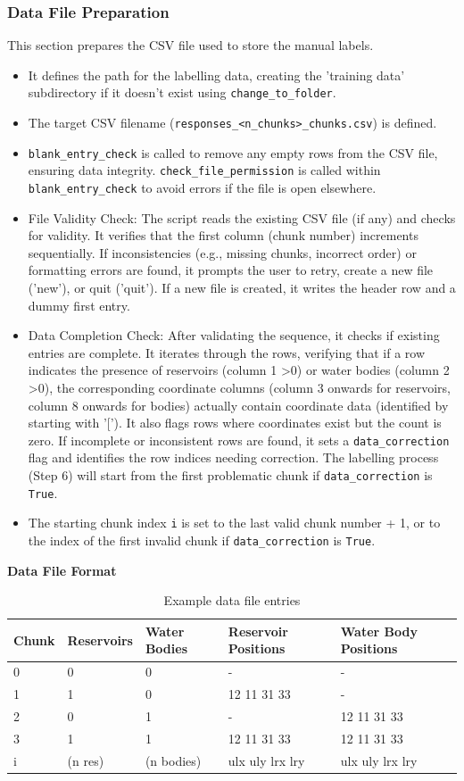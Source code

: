 \subsubsection{Data File Preparation}
This section prepares the CSV file used to store the manual labels.
\begin{itemize}
    \item It defines the path for the labelling data, creating the 'training data' subdirectory if it doesn't exist using \verb|change_to_folder|.
    \item The target CSV filename (\verb|responses_<n_chunks>_chunks.csv|) is defined.
    \item \verb|blank_entry_check| is called to remove any empty rows from the CSV file, ensuring data integrity. \verb|check_file_permission| is called within \verb|blank_entry_check| to avoid errors if the file is open elsewhere.
    \item File Validity Check: The script reads the existing CSV file (if any) and checks for validity. It verifies that the first column (chunk number) increments sequentially. If inconsistencies (e.g., missing chunks, incorrect order) or formatting errors are found, it prompts the user to retry, create a new file ('new'), or quit ('quit'). If a new file is created, it writes the header row and a dummy first entry.
    \item Data Completion Check: After validating the sequence, it checks if existing entries are complete. It iterates through the rows, verifying that if a row indicates the presence of reservoirs (column 1 \textgreater 0) or water bodies (column 2 \textgreater 0), the corresponding coordinate columns (column 3 onwards for reservoirs, column 8 onwards for bodies) actually contain coordinate data (identified by starting with '['). It also flags rows where coordinates exist but the count is zero. If incomplete or inconsistent rows are found, it sets a \verb|data_correction| flag and identifies the row indices needing correction. The labelling process (Step 6) will start from the first problematic chunk if \verb|data_correction| is \verb|True|.
    \item The starting chunk index \verb|i| is set to the last valid chunk number + 1, or to the index of the first invalid chunk if \verb|data_correction| is \verb|True|.
\end{itemize}

\textbf{Data File Format}
\begin{table}[h]
\centering
\begin{tabular}{l | l | l | l | l}
Chunk & Reservoirs & Water Bodies & Reservoir Positions & Water Body Positions \\
\hline
0 & 0 & 0 & - & - \\
1 & 1 & 0 & 12 11 31 33 & - \\
2 & 0 & 1 & - & 12 11 31 33 \\
3 & 1 & 1 & 12 11 31 33 & 12 11 31 33 \\
i & (n res) & (n bodies) & ulx uly lrx lry & ulx uly lrx lry \\
\end{tabular}
\caption{Example data file entries}
\label{tab:abc}
\end{table}


